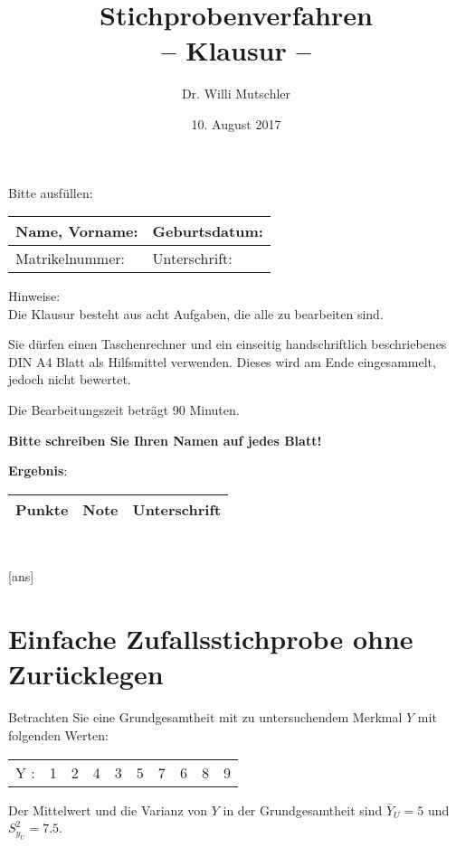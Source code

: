 \documentclass{article}
\begin{document}
	
	\title{Stichprobenverfahren\\ -- Klausur --}	
	\author{Dr. Willi Mutschler}
	\date{10. August 2017}
	\maketitle\thispagestyle{empty}
	Bitte ausf\"ullen: \\[.3cm]
	{\renewcommand{\arraystretch}{2} \small \normalsize
		\begin{tabular}{|p{}|p{}|} \hline
			Name, Vorname: \hfill & Geburtsdatum: \hfill \\[1cm] \hline Matrikelnummer: \hfill & Unterschrift: \hfill \\ [1cm]\hline
	\end{tabular}}
	
	\vspace{.4cm}
	
	\renewcommand{\baselinestretch}{1.3} \small \normalsize
	
	Hinweise: \\
	\rm Die Klausur besteht aus acht Aufgaben, die alle zu bearbeiten sind.
	
	Sie dürfen einen Taschenrechner und ein einseitig handschriftlich beschriebenes DIN A4 Blatt als Hilfsmittel verwenden. Dieses wird am Ende eingesammelt, jedoch nicht bewertet.
	
	Die Bearbeitungszeit beträgt 90 Minuten.	
	
	{\bf Bitte schreiben Sie Ihren Namen auf jedes Blatt!}
	
	\vspace{.4cm}
\textbf{Ergebnis}:
\vspace{.4cm}	~\\
\begin{tabular}{|p{}|p{}|p{}|}
	\hline 
	Punkte & Note & Unterschrift \\ [1cm]
	\hline 
\end{tabular} 
	\newpage~\thispagestyle{empty}\newpage
	
	[ans]
	
	\setcounter{page}{1}

\section{Einfache Zufallsstichprobe ohne Zurücklegen}
Betrachten Sie eine Grundgesamtheit mit zu untersuchendem Merkmal $Y$ mit folgenden Werten:
\begin{center}
\begin{tabular}{c|c|c|c|c|c|c|c|c|c}	 
	Y : & 1 & 2 & 4 & 3 & 5 & 7 & 6 & 8 & 9 \\ 
\end{tabular} 
\end{center}
Der Mittelwert und die Varianz von $Y$ in der Grundgesamtheit sind $\bar{Y}_U=5$ und $S_{y_U}^2=7.5$.
\end{document}
